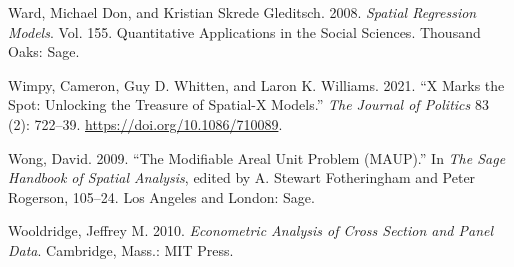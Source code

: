 \documentclass[
  letterpaper,
  DIV=11,
  numbers=noendperiod]{scrreprt}
\newlength{\cslhangindent}
\newlength{\cslentryspacingunit} %
\newenvironment{CSLReferences}[2] %
 {%
  \setlength{\parindent}{0pt}
  \ifodd #1
  \let\oldpar\par
  \def\par{\hangindent=\cslhangindent\oldpar}
  \fi
  \setlength{\parskip}{#2\cslentryspacingunit}
 }%
 {}
\begin{document}
\begin{CSLReferences}{1}{0}
\leavevmode{}%
Ward, Michael Don, and Kristian Skrede Gleditsch. 2008. \emph{Spatial
{Regression Models}}. Vol. 155. Quantitative {Applications} in the
{Social Sciences}. {Thousand Oaks}: {Sage}.

\leavevmode{}%
Wimpy, Cameron, Guy D. Whitten, and Laron K. Williams. 2021. {``X
{Marks} the {Spot}: {Unlocking} the {Treasure} of {Spatial-X Models}.''}
\emph{The Journal of Politics} 83 (2): 722--39.
\url{https://doi.org/10.1086/710089}.

\leavevmode{}%
Wong, David. 2009. {``The {Modifiable Areal Unit Problem} ({MAUP}).''}
In \emph{The {Sage Handbook} of {Spatial Analysis}}, edited by A.
Stewart Fotheringham and Peter Rogerson, 105--24. {Los Angeles and
London}: {Sage}.

\leavevmode{}%
Wooldridge, Jeffrey M. 2010. \emph{Econometric {Analysis} of {Cross
Section} and {Panel Data}}. {Cambridge, Mass.}: {MIT Press}.

\end{CSLReferences}
\end{document}
